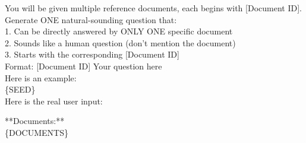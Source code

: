 
\begin{tcolorbox}[
    enhanced,
    colback=white, %
    colframe=black, %
    arc=5mm, %
    boxrule=1pt,
    left=2mm, %
    right=2mm, %
    top=1mm, %
    bottom=1mm %
]

You will be given multiple reference documents, each begins with [Document ID]. \\
Generate ONE natural-sounding question that:\\
1. Can be directly answered by ONLY ONE specific document\\
2. Sounds like a human question (don't mention the document)\\
3. Starts with the corresponding [Document ID]\\
 
 
Format: [Document ID] Your question here\\
 
Here is an example:\\
 
\{SEED\}\\
 
Here is the real user input:
 
**Documents:**\\
\{DOCUMENTS\}\\


\end{tcolorbox}